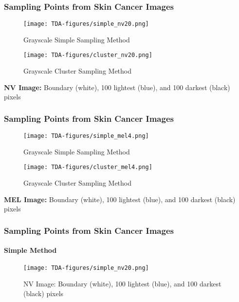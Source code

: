 \documentclass[aspectratio=169]{beamer}
\begin{document}
\begin{frame}
\frametitle{Sampling Points from Skin Cancer Images}
\vspace*{-10mm}

\begin{figure}[H]
\centering
\begin{minipage}{.45\textwidth}
  \centering
  \texttt{[image: TDA-figures/simple\_nv20.png]}
  \caption{Grayscale Simple Sampling Method}
\end{minipage}\hspace{10mm} %
\begin{minipage}{.45\textwidth}
  \centering
  \texttt{[image: TDA-figures/cluster\_nv20.png]}
  \caption{Grayscale Cluster Sampling Method}
\end{minipage}
\end{figure}

\centering
{\bfseries \textcolor{UF_dark_blue}{NV Image:}} Boundary (white), 100 lightest (blue), and 100 darkest (black) pixels
\end{frame}


\begin{frame}
\frametitle{Sampling Points from Skin Cancer Images}
\vspace*{-10mm}

\begin{figure}[H]
\centering
\begin{minipage}{.45\textwidth}
  \centering
  \texttt{[image: TDA-figures/simple\_mel4.png]}
  \caption{Grayscale Simple Sampling Method}
\end{minipage}\hspace{10mm} %
\begin{minipage}{.45\textwidth}
  \centering
  \texttt{[image: TDA-figures/cluster\_mel4.png]}
  \caption{Grayscale Cluster Sampling Method}
\end{minipage}
\end{figure}

\centering
{\bfseries \textcolor{UF_dark_blue}{MEL Image:}} Boundary (white), 100 lightest (blue), and 100 darkest (black) pixels
\end{frame}


\iffalse
\begin{frame}
\frametitle{Sampling Points from Skin Cancer Images} \framesubtitle{Simple Method}
\begin{figure}[H]
  \centering
  \texttt{[image: TDA-figures/simple\_nv20.png]}
  \caption{NV Image: Boundary (white), 100 lightest (blue), and 100 darkest (black) pixels}
\end{figure}
\end{frame}
\end{document}
